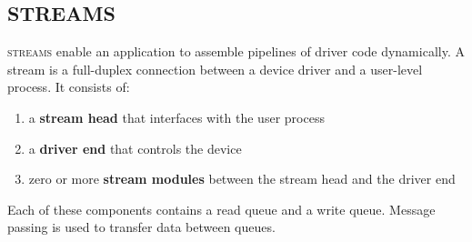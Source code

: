 \subsection{STREAMS}\label{subsec:STREAMS}
\textsc{streams} enable an application to assemble pipelines of driver code dynamically.
A stream is a full-duplex connection between a device driver and a user-level process.
It consists of:
\begin{enumerate}[noitemsep]
\item a \textbf{stream head} that interfaces with the user process
\item a \textbf{driver end} that controls the device
\item zero or more \textbf{stream modules} between the stream head and the driver end
\end{enumerate}

Each of these components contains a read queue and a write queue.
Message passing is used to transfer data between queues.


